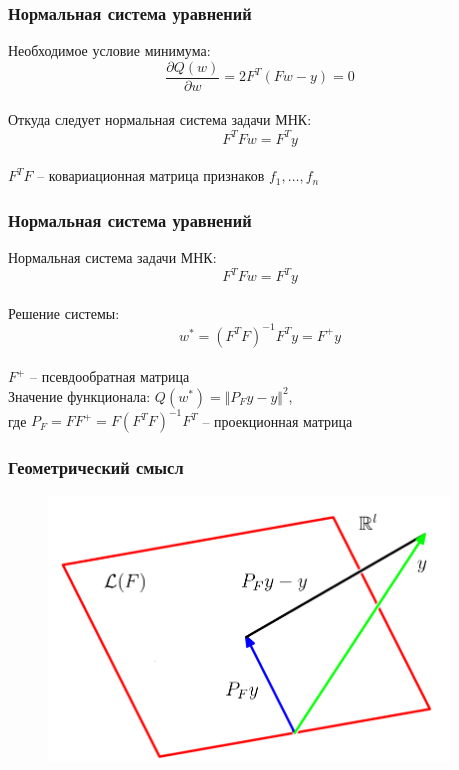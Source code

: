 \documentclass[12pt, aspectratio=169]{beamer}
\begin{document}
\begin{frame}\frametitle{Нормальная система уравнений}
Необходимое условие минимума:\\
$$\frac{\partial Q(w)}{\partial w}  = 2 F^T(F w - y) = 0$$\\
Откуда следует нормальная система задачи МНК:\\
$$F^TFw = F^Ty$$\\
$F^TF$ -- ковариационная матрица признаков $f_1, \dots, f_n$\\
\end{frame}

\begin{frame}\frametitle{Нормальная система уравнений}
Нормальная система задачи МНК:
$$F^TFw = F^Ty$$\\
Решение системы:\\
$$w^* = (F^TF)^{-1}F^Ty = F^+y$$\\
$F^+$ -- псевдообратная матрица\\
\vspace{5mm}
Значение функционала: $Q(w^*) = \Vert P_F y - y \Vert^2$,\\
где $P_F = FF^+ = F(F^TF)^{-1}F^T$ -- проекционная матрица
\end{frame}

\begin{frame}\frametitle{Геометрический смысл}
\begin{figure}[htbp]
  \includegraphics[height=200pt, keepaspectratio = true]{images/geometry}   
\end{figure}
\end{frame}
\end{document}
